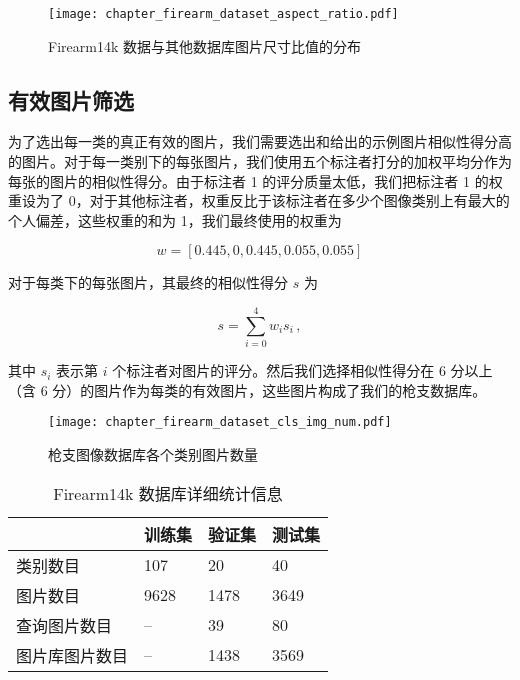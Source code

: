 \begin{figure}[!t]
	\centering
	\texttt{[image: chapter\_firearm\_dataset\_aspect\_ratio.pdf]}
	\caption{Firearm14k 数据与其他数据库图片尺寸比值的分布}
	\label{fig:dataset_aspect_ratio}
\end{figure}

\subsection{有效图片筛选}
为了选出每一类的真正有效的图片，我们需要选出和给出的示例图片相似性得分高的图片。对于每一类别下的每张图片，我们使用五个标注者打分的加权平均分作为每张的图片的相似性得分。由于标注者 1 的评分质量太低，我们把标注者 1 的权重设为了 0，对于其他标注者，权重反比于该标注者在多少个图像类别上有最大的个人偏差，这些权重的和为 1，我们最终使用的权重为

 \[w = [0.445, 0, 0.445, 0.055, 0.055]\]

对于每类下的每张图片，其最终的相似性得分 $s$ 为

\begin{equation}
s = \sum_{i=0}^{4}w_{i}s_{i}\, ,
\end{equation}

其中 $s_i$ 表示第 $i$ 个标注者对图片的评分。然后我们选择相似性得分在 6 分以上（含 6 分）的图片作为每类的有效图片，这些图片构成了我们的枪支数据库。

\begin{figure}[!t]
	\centering
	\texttt{[image: chapter\_firearm\_dataset\_cls\_img\_num.pdf]}
	\caption{枪支图像数据库各个类别图片数量}
	\label{fig:dataset_cls_img_num}
\end{figure}

\begin{table}[!t]
	\centering
	\caption[Firearm14k 数据库详细统计信息]{Firearm14k 数据库详细统计信息}
	\label{table:train_val_test_stat}
	\begin{tabular}{@{}llll@{}}
		\toprule
		          & 训练集 & 验证集 & 测试集 \\
		\midrule
		类别数目 & 107       & 20             & 40       \\
		图片数目 & 9628      & 1478           & 3649     \\
		查询图片数目 & --        & 39             & 80       \\
		图片库图片数目 & -- & 1438 &  3569 \\
		\bottomrule
	\end{tabular}
\end{table}

